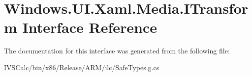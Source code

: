 \hypertarget{interface_windows_1_1_u_i_1_1_xaml_1_1_media_1_1_i_transform}{}\section{Windows.\+U\+I.\+Xaml.\+Media.\+I\+Transform Interface Reference}
\label{interface_windows_1_1_u_i_1_1_xaml_1_1_media_1_1_i_transform}


The documentation for this interface was generated from the following file\+:\begin{DoxyCompactItemize}
\item 
I\+V\+S\+Calc/bin/x86/\+Release/\+A\+R\+M/ilc/Safe\+Types.\+g.\+cs\end{DoxyCompactItemize}
